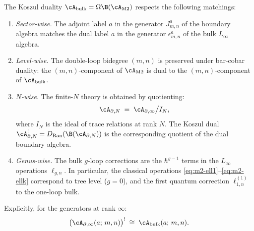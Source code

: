 \begin{conjecture}
\label{conj:m2-four-fold-matching}
The Koszul duality $\cA_{\mathrm{bulk}} =
\Omega\B(\cA_{\mathrm{M2}})$ respects the following matchings:
\begin{enumerate}
\item \emph{Sector-wise.} The adjoint label $a$ in the generator
 $J^a_{m,n}$ of the boundary algebra matches the dual label $a$ in
 the generator $\epsilon^a_{m,n}$ of the bulk $L_\infty$ algebra.
\item \emph{Level-wise.} The double-loop bidegree $(m,n)$ is
 preserved under bar-cobar duality: the $(m,n)$-component of
 $\cA_{\mathrm{M2}}$ is dual to the $(m,n)$-component of
 $\cA_{\mathrm{bulk}}$.
\item \emph{$N$-wise.} The finite-$N$ theory is obtained by
 quotienting:
 \begin{equation}\label{eq:m2-finite-N}
 \cA_{\partial,N}
 \;=\;
 \cA_{\partial,\infty}\big/I_N,
 \end{equation}
 where $I_N$ is the ideal of trace relations at rank $N$. The
 Koszul dual $\cA^!_{\partial,N} = D_{\mathrm{Ran}}(\B(\cA_{\partial,N}))$
 is the corresponding quotient of the dual boundary algebra.
\item \emph{Genus-wise.} The bulk $g$-loop corrections are the
 $\hbar^{g-1}$ terms in the $L_\infty$ operations $\ell_{g,n}$.
 In particular, the classical operations
 \eqref{eq:m2-ell1}--\eqref{eq:m2-ellk} correspond to
 tree level ($g=0$), and the first quantum correction
 $\ell_{1,n}^{(1)}$ to the one-loop bulk.
\end{enumerate}
Explicitly, for the generators at rank $\infty$:
\begin{equation}\label{eq:m2-explicit-koszul}
 \bigl(\cA_{\partial,\infty}(a;\,m,n)\bigr)^{!}
 \;\cong\;
 \cA_{\mathrm{bulk}}(a;\,m,n).
\end{equation}
\end{conjecture}


